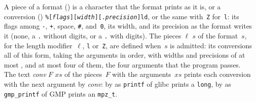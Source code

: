 \begin{definition}\label{def:Printf.parseFormat}
  \leanok
  A piece of a format () is a character that the format prints as it
  is, or a conversion ()
  \texttt{\%[\textit{flags}][\textit{width}][.\textit{precision}]ld}, or the same with~\texttt{Z}
  for~\texttt{l}: its flags among \texttt{-}, \texttt{+}, space, \texttt{\#},
  \texttt{\textquotesingle} and~\texttt{0}, its width, and its precision as the format writes it
  (none, a \texttt{.} without digits, or a \texttt{.} with digits). The pieces
   $\ell$ $s$ of the format~$s$, for the length modifier~$\ell$,
  \texttt{l} or~\texttt{Z}, are defined when~$s$ is admitted: its conversions all of this form,
  taking the arguments in order, with widths and precisions of at most
  , and at most four of them, the four arguments that the program
  passes. The text  \textit{conv} $F$ $\mathit{xs}$ of the pieces~$F$
  with the arguments~$\mathit{xs}$ prints each conversion with the next argument by \textit{conv}:
  by  as \texttt{printf} of glibc prints a \texttt{long}, by
   as \texttt{gmp\_printf} of GMP prints an \texttt{mpz\_t}.
\end{definition}

